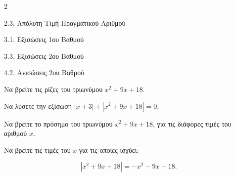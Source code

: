 \begin{ylh}{2}
    \item 2.3. Απόλυτη Τιμή Πραγματικού Αριθμού
    \item 3.1. Εξισώσεις 1ου Βαθμού
    \item 3.3. Εξισώσεις 2ου Βαθμού
    \item 4.2. Ανισώσεις 2ου Βαθμού
\end{ylh}

\begin{alist}
\item
\begin{rlist}
\item
  Να βρείτε τις ρίζες του τριωνύμου $x^{2} + 9x + 18$.
\item
  Να λύσετε την εξίσωση $|x + 3| + \left| x^{2} + 9x + 18 \right| = 0$.
\end{rlist}
\item
\begin{rlist}
\item
  Να βρείτε το πρόσημο του τριωνύμου $x^{2} + 9x + 18$, για τις διάφορες τιμές του αριθμού $x$.
\item
  Να βρείτε τις τιμές του $x$ για τις οποίες ισχύει:

\begin{equation*}\left| x^{2} + 9x + 18 \right| = - x^{2} - 9x - 18.\end{equation*}
\end{rlist}
\end{alist}

